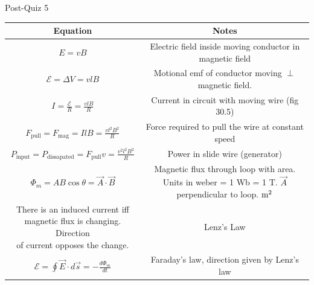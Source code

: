 \documentclass{article}
\begin{document}
\begin{section}{Post-Quiz 5}
 \begin{tabular}{|c|c|}
	 \hline
	 Equation                                                                      & Notes                                                    \\
	 \hline

	 $E = vB$                                                                      & Electric field inside moving conductor in magnetic field \\

	 $\mathcal E = \Delta V = v l B$                                               & Motional emf of conductor moving $\perp$ magnetic field. \\

	 $I = \frac{\mathcal E}{R} = \frac{vlB}{R}$                                    & Current in circuit with moving wire (fig 30.5)           \\

	 $F_\text{pull} = F_\text{mag} = IlB = \frac{vl^2B^2}{R}$                      & Force required to pull the wire at constant speed        \\

	 $P_\text{input} = P_\text{dissapated} = F_\text{pull}v = \frac{v^2l^2B^2}{R}$ & Power in slide wire (generator)                          \\

	 $\Phi_m = AB \cos \theta = \vec A \cdot \vec B $                              & \makecell{Magnetic flux through loop with area. Units in \\
	 weber = 1 Wb = 1 T. $\vec A$ perpendicular to loop. $\text m^2$}                                                                         \\

	 \makecell{There is an induced current iff                                                                                                \\
	 magnetic flux is changing. Direction                                                                                                     \\
	 of current opposes the change.}                                               & Lenz's Law                                               \\

	 $\mathcal E = \oint \vec E \cdot d \vec s =  -\frac{d \Phi_m}{dt} $           & Faraday's law, direction given by Lenz's law             \\


\end{tabular}
\end{section}
\end{document}
